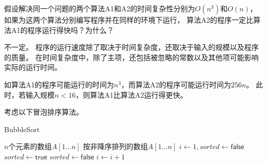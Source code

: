 \documentclass[answers]{exam}
\begin{document}
\begin{questions}
    \newpage

    \question 假设解决同一个问题的两个算法A1和A2的时间复杂性分别为$O(n^3)$和$O(n)$，
    如果为这两个算法分别编写程序并在同样的环境下运行，
    算法A2的程序一定比算法A1的程序运行得快吗？为什么？

    \begin{solution}
        不一定。
        程序的运行速度除了取决于时间复杂度，还取决于输入的规模以及程序的质量。
        在时间复杂度中，除了主项，还包括被忽略的常数以及其他项可能影响实际的运行时间。

        如算法A1的程序可能运行的时间为$n^3$，而算法A2的程序可能运行时间为$256n$。
        此时，若输入规模$n < 16$，则算法A1比算法A2运行得更快。
    \end{solution}

    \newpage

    \question 考虑以下冒泡排序算法。
    \begin{algorithm}
        \caption{BubbleSort}
        \begin{algorithmic}[1]
            \Require $n$个元素的数组$A[1 \dots n]$
            \Ensure 按非降序排列的数组$A[1 \dots n]$
            \State $i \gets 1, sorted \gets \mathsf{false}$
            \State $sorted \gets \mathsf{true}$
            \State {}
            \State $sorted \gets \mathsf{false}$
            \EndIf
            \EndFor
            \State  $i \gets i+1$
            \EndWhile
        \end{algorithmic}
    \end{algorithm}
\end{questions}
\end{document}
